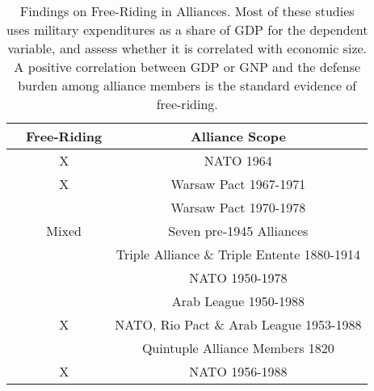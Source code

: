\documentclass[12pt]{article}
\begin{document}
\begin{table}[hbt!]
\begin{tabular}{lcc}
  & Free-Riding & Alliance Scope \\
\hline
\citet{OlsonZeckhauser1966} & X  & NATO 1964 \\
\citet{Starr1974} & X & Warsaw Pact 1967-1971 \\
\citet{Reisinger1983} &  & Warsaw Pact 1970-1978 \\
\citet{Thies1987} & Mixed & Seven pre-1945 Alliances \\ 
\citet{ConybeareSandler1990} &  & Triple Alliance \& Triple Entente 1880-1914 \\
\citet{Palmer1990} &   & NATO 1950-1978 \\
\citet{Chenetal1996} &  & Arab League 1950-1988 \\
\citet{OnealWhatley1996} & X & NATO, Rio Pact \& Arab League 1953-1988 \\
\citet{Siroky2012} &  & Quintuple Alliance Members 1820 \\
\citet{PluemperNeumayer2015} & X & NATO 1956-1988 \\
\hline 
\end{tabular}
\caption{Findings on Free-Riding in Alliances. Most of these studies uses military expenditures as a share of GDP for the dependent variable, and assess whether it is correlated with economic size. A positive correlation between GDP or GNP and the defense burden among alliance members is the standard evidence of free-riding.}
\end{table}






  
% 
\end{document}
